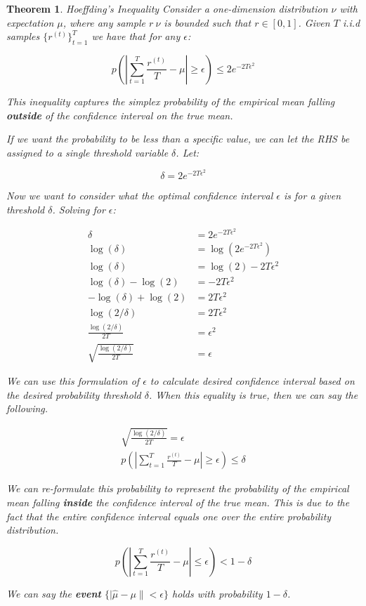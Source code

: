 \documentclass[11pt]{article}
\newtheorem{theorem}{Theorem}
\begin{document}
\begin{theorem}{Hoeffding's Inequality}
\textit{Consider a one-dimension distribution $\nu$ with expectation $\mu$, where any sample $r ~ \nu$ is bounded such that $r \in [0,1]$. Given $T$ i.i.d samples $\{r^{(t)}\}_{t=1}^T$ we have that for any $\epsilon$:}

\begin{equation}
    p(|\sum_{t=1}^T\frac{r^{(t)}}{T} - \mu| \geq \epsilon) \leq 2e^{-2T\epsilon^2}
\end{equation}

This inequality captures the simplex probability of the empirical mean falling \textbf{outside} of the confidence interval on the true mean. 

If we want the probability to be less than a specific value, we can let the RHS be assigned to a single threshold variable $\delta$. Let:

\begin{equation}
    \delta = 2e^{-2T\epsilon^2}
\end{equation}

Now we want to consider what the optimal confidence interval $\epsilon$ is for a given threshold $\delta$. Solving for $\epsilon$:

\begin{align}
    \delta &= 2e^{-2T\epsilon^2} \\
    \log(\delta) &= \log(2e^{-2T\epsilon^2}) \\
    \log(\delta) &= \log(2) -2T\epsilon^2 \\
    \log(\delta) - \log(2)&= -2T\epsilon^2 \\
    -\log(\delta) + \log(2)&= 2T\epsilon^2 \\
    \log(2 / \delta) &= 2T\epsilon^2 \\
    \frac{\log(2 / \delta)}{2T} &= \epsilon^2 \\
    \sqrt{\frac{\log(2 / \delta)}{2T}} &= \epsilon
\end{align}

We can use this formulation of $\epsilon$ to calculate desired confidence interval based  on the desired probability threshold $\delta$. When this equality is true, then we can say the following.

\begin{gather}
    \sqrt{\frac{\log(2 / \delta)}{2T}} = \epsilon \\
    p(|\sum_{t=1}^T\frac{r^{(t)}}{T} - \mu| \geq \epsilon) \leq \delta 
\end{gather}

We can re-formulate this probability to represent the probability of the empirical mean falling \textbf{inside} the confidence interval of the true mean. This is due to the fact that the entire confidence interval equals one over the entire probability distribution. 

\begin{equation}
    p(|\sum_{t=1}^T\frac{r^{(t)}}{T} - \mu| \leq \epsilon) < 1 - \delta
\end{equation}

We can say the \textbf{event} $\{|\hat{\mu} - \mu \| < \epsilon\}$ holds with probability $1-\delta$.
\end{theorem}
\end{document}
